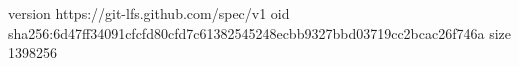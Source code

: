 version https://git-lfs.github.com/spec/v1
oid sha256:6d47ff34091cfcfd80cfd7c61382545248ecbb9327bbd03719cc2bcac26f746a
size 1398256
